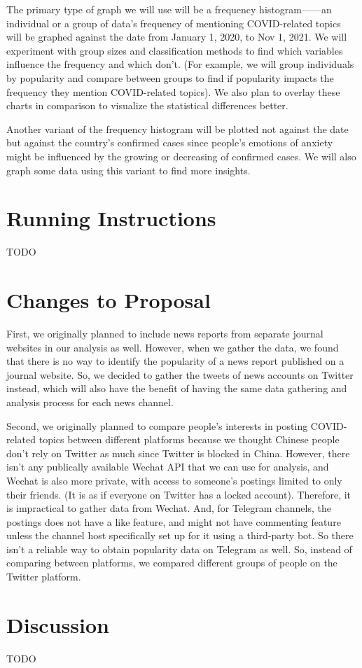 \documentclass{article}
\begin{document}
    The primary type of graph we will use will be a frequency histogram——an individual or a group of data’s frequency of mentioning COVID-related topics will be graphed against the date from January 1, 2020, to Nov 1, 2021. We will experiment with group sizes and classification methods to find which variables influence the frequency and which don’t. (For example, we will group individuals by popularity and compare between groups to find if popularity impacts the frequency they mention COVID-related topics). We also plan to overlay these charts in comparison to visualize the statistical differences better.

    Another variant of the frequency histogram will be plotted not against the date but against the country’s confirmed cases since people’s emotions of anxiety might be influenced by the growing or decreasing of confirmed cases. We will also graph some data using this variant to find more insights.

    \section{Running Instructions}
    \indent

    TODO

    \section{Changes to Proposal}
    \indent

    First, we originally planned to include news reports from separate journal websites in our analysis as well. However, when we gather the data, we found that there is no way to identify the popularity of a news report published on a journal website. So, we decided to gather the tweets of news accounts on Twitter instead, which will also have the benefit of having the same data gathering and analysis process for each news channel.

    Second, we originally planned to compare people's interests in posting COVID-related topics between different platforms because we thought Chinese people don't rely on Twitter as much since Twitter is blocked in China. However, there isn't any publically available Wechat API that we can use for analysis, and Wechat is also more private, with access to someone's postings limited to only their friends. (It is as if everyone on Twitter has a locked account). Therefore, it is impractical to gather data from Wechat. And, for Telegram channels, the postings does not have a like feature, and might not have commenting feature unless the channel host specifically set up for it using a third-party bot. So there isn't a reliable way to obtain popularity data on Telegram as well. So, instead of comparing between platforms, we compared different groups of people on the Twitter platform.

    \section{Discussion}
    \indent

    TODO
    
    
\nocite{*}
\printbibliography
\end{document}
